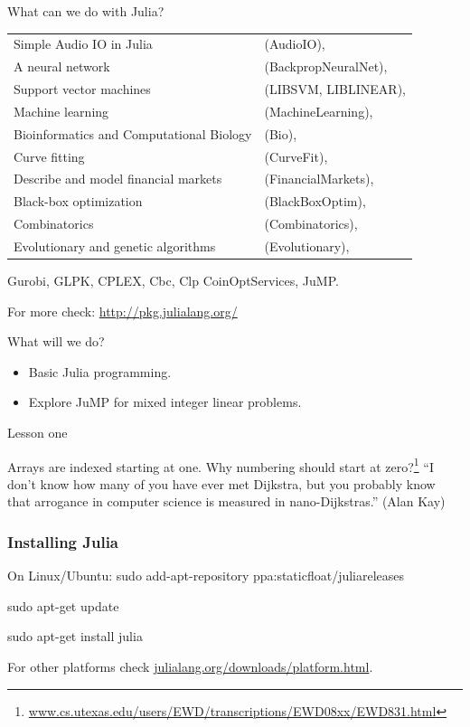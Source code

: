 \documentclass{beamer}
\begin{document}
\begin{frame}{What can we do with Julia?}

  \footnotesize
  \begin{tabular}[htpb]{ll}
    Simple Audio IO in Julia & (AudioIO),\\
    A neural network & (BackpropNeuralNet),\\
   Support vector machines & (LIBSVM, LIBLINEAR),\\
   Machine learning & (MachineLearning),\\
   Bioinformatics and Computational Biology & (Bio),\\
   Curve fitting& (CurveFit),\\
   Describe and model financial markets& (FinancialMarkets),\\
   Black-box optimization& (BlackBoxOptim),\\
   Combinatorics& (Combinatorics),\\
   Evolutionary and genetic algorithms& (Evolutionary),\\
  \end{tabular}
  
  \vfill
  Gurobi, GLPK, CPLEX, Cbc, Clp CoinOptServices, JuMP.

  For more check:
   \url{http://pkg.julialang.org/}
  
\end{frame}

\begin{frame}{What will we do?}
  \begin{itemize}
  \item[] Basic Julia programming.
  \item[] Explore JuMP for mixed integer linear problems.
  \end{itemize}
\end{frame}

\begin{frame}{Lesson one}

  Arrays are indexed starting at one.
  \pause
  \vfill
  Why numbering should start at zero?\footnote{\url{www.cs.utexas.edu/users/EWD/transcriptions/EWD08xx/EWD831.html}}
  \pause
  ``I don't know how many of you have ever met Dijkstra, but you probably know that arrogance in computer science is measured in nano-Dijkstras.'' (Alan Kay)
\end{frame}

\begin{frame}
  \frametitle{Installing Julia}

  \begin{block}{On Linux/Ubuntu:}
  sudo add-apt-repository ppa:staticfloat/juliareleases

  sudo apt-get update

  sudo apt-get install julia  
  \end{block}
  \vspace{2cm}
  For other platforms check \url{julialang.org/downloads/platform.html}.
\end{frame}
\end{document}
